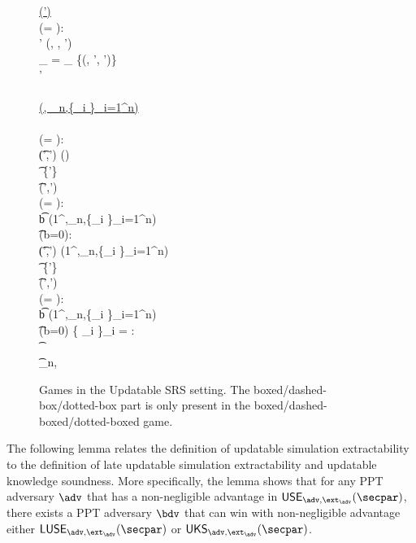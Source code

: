 \begin{figure}[!ht]
\begin{center}
{\begin{minipage}[t]{0.45\linewidth}
{			\underline{\simO(\inp')}\\
			\pcif (\srs = \bot): \pcreturn \bot \\
			\zkproof'  \gets \simulator(\srs, \td, \inp')\\
			_{\srs} = _{\srs} \cup \{(\srs, \inp', \zkproof')\}\\
			\pcreturn  \zkproof' \\
			\\
			\underline{\initU(\intent, \srs_n,\{\rho_i \}_{i=1}^n)}\\
			\dashedbox{\dottedbox{\pcif \srs \neq \bot: \pcreturn \bot}} \\
			\pcif (\intent = \setup): \\
			\t (\srs',\rho') \leftarrow \kgen(\REL)\\
			\t {} \gets {} \cup \{\rho'\}\\
			\t \pcreturn (\srs',\rho')\\
			\pcif (\intent = \update): \\
			\t b \gets \verifyCRS(1^\secpar,\srs_n,\{\rho_i \}_{i=1}^{n})\\
			\t \pcif (b=0): \pcreturn \bot \\
			\t (\srs',\rho') \leftarrow \upd(1^\secpar,\srs_n,\{\rho_i \}_{i=1}^n)\\
			\t {} \gets {} \cup \{\rho'\}\\
			\t \pcreturn (\srs',\rho')\\
			\pcif (\intent = \final): \\
			\t b \gets \verifyCRS(1^\secpar,\srs_n,\{\rho_i \}_{i=1}^{n})\\
			\t \pcif (b=0) \vee {} \cap \{ \rho_i \}_i = \emptyset: \pcreturn \bot \\
			\t {} \\
			\t \srs \gets \srs_n, \pcreturn \srs \\
			\pcelse \pcreturn \bot
		}
	\end{minipage}
	}
		\caption{Games in the Updatable SRS setting. The boxed/dashed-box/dotted-box part is only present in the boxed/dashed-boxed/dotted-boxed game.} 
		\label{fig:upd}
	\end{center}
\end{figure}

The following lemma relates the definition of updatable simulation extractability to the definition of late updatable simulation extractability and updatable knowledge soundness. More specifically, the lemma shows that for any PPT adversary $\advse$ that has a non-negligible advantage in $\USE_{\advse,\ext_{\advse}}(\secpar)$, there exists a PPT adversary $\bdv$ that can win with non-negligible advantage either $\LUSE_{\advse,\ext_{\advse}}(\secpar)$ or $\UKS_{\advse,\ext_{\advse}}(\secpar)$.

